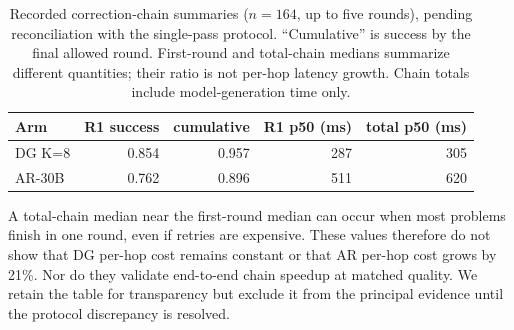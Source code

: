 \begin{table}[ht]
\centering
\caption{Recorded correction-chain summaries ($n{=}164$, up to five
rounds), pending reconciliation with the single-pass protocol. ``Cumulative''
is success by the final allowed round. First-round and total-chain
medians summarize different quantities; their ratio is not per-hop
latency growth. Chain totals include model-generation time only.}
\label{tab:chain}
\begin{tabular}{@{}lrrrr@{}}
\toprule
Arm & R1 success & cumulative & R1 p50 (ms) & total p50 (ms) \\
\midrule
DG K=8  & 0.854 & 0.957 & 287 & 305 \\
AR-30B  & 0.762 & 0.896 & 511 & 620 \\
\bottomrule
\end{tabular}
\end{table}

A total-chain median near the first-round median can occur when most
problems finish in one round, even if retries are expensive. These values
therefore do not show that DG per-hop cost remains constant or that AR
per-hop cost grows by 21\%. Nor do they validate end-to-end chain speedup
at matched quality. We retain the table for transparency but exclude it
from the principal evidence until the protocol discrepancy is resolved.
